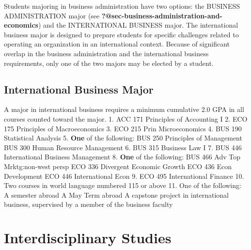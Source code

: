\documentclass[
  letterpaper,
]{scrbook}
\begin{document}
Students majoring in business administration have two options: the
BUSINESS ADMINISTRATION major (see
\textbf{?@sec-business-administration-and-economics}) and the
INTERNATIONAL BUSINESS major. The international business major is
designed to prepare students for specific challenges related to
operating an organization in an international context. Because of
significant overlap in the business administration and the international
business requirements, only one of the two majors may be elected by a
student.

\hypertarget{international-business-major}{%
\subsection{International Business
Major}\label{international-business-major}}

A major in international business requires a minimum cumulative 2.0 GPA
in all courses counted toward the major. 1. ACC 171 Principles of
Accounting I 2. ECO 175 Principles of Macroeconomics 3. ECO 215 Prin
Microeconomics 4. BUS 190 Statistical Analysis 5. \textbf{One} of the
following: BUS 250 Principles of Management BUS 300 Human Resource
Management 6. BUS 315 Business Law I 7. BUS 446 International Business
Management 8. \textbf{One} of the following: BUS 466 Adv Top
Mrktg:non-west persp ECO 336 Divergent Economic Growth ECO 436 Econ
Development ECO 446 International Econ 9. ECO 495 International Finance
10. Two courses in world language numbered 115 or above 11. One of the
following: A semester abroad A May Term abroad A capstone project in
international business, supervised by a member of the business faculty

\hypertarget{sec-interdisciplinary-studies}{%
\section{Interdisciplinary
Studies}\label{sec-interdisciplinary-studies}}
\end{document}
